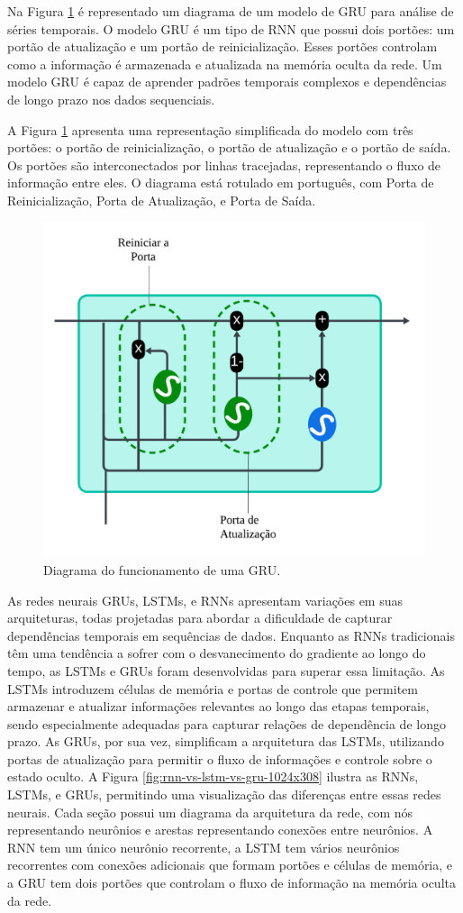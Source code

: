  Na Figura \ref{fig:gru} é representado um diagrama de um modelo de GRU para análise de séries temporais. O modelo GRU é um tipo de RNN que possui dois portões: um portão de atualização e um portão de reinicialização. Esses portões controlam como a informação é armazenada e atualizada na memória oculta da rede. Um modelo GRU é capaz de aprender padrões temporais complexos e dependências de longo prazo nos dados sequenciais. 
 
 A Figura \ref{fig:gru} apresenta uma representação simplificada do modelo com três portões: o portão de reinicialização, o portão de atualização e o portão de saída. Os portões são interconectados por linhas tracejadas, representando o fluxo de informação entre eles. O diagrama está rotulado em português, com Porta de Reinicialização, Porta de Atualização, e Porta de Saída\cite{Saranya2020, Jordan2021, Khan2022}.
 
 \begin{figure}[!htb]
 \centering
 \caption{Diagrama do funcionamento de uma GRU.}
 \label{fig:gru}
 \includegraphics[width=0.5\linewidth]{Modelos/Figuras/gru.pdf}
\end{figure}
 
 As redes neurais GRUs, LSTMs, e RNNs apresentam variações em suas arquiteturas, todas projetadas para abordar a dificuldade de capturar dependências temporais em sequências de dados. Enquanto as RNNs tradicionais têm uma tendência a sofrer com o desvanecimento do gradiente ao longo do tempo, as LSTMs e GRUs foram desenvolvidas para superar essa limitação. As LSTMs introduzem células de memória e portas de controle que permitem armazenar e atualizar informações relevantes ao longo das etapas temporais, sendo especialmente adequadas para capturar relações de dependência de longo prazo. As GRUs, por sua vez, simplificam a arquitetura das LSTMs, utilizando portas de atualização para permitir o fluxo de informações e controle sobre o estado oculto.
 A Figura \ref{fig:rnn-vs-lstm-vs-gru-1024x308} ilustra as RNNs, LSTMs, e GRUs, permitindo uma visualização das diferenças entre essas redes neurais. Cada seção possui um diagrama da arquitetura da rede, com nós representando neurônios e arestas representando conexões entre neurônios. A RNN tem um único neurônio recorrente, a LSTM tem vários neurônios recorrentes com conexões adicionais que formam portões e células de memória, e a GRU tem dois portões que controlam o fluxo de informação na memória oculta da rede. 
 
